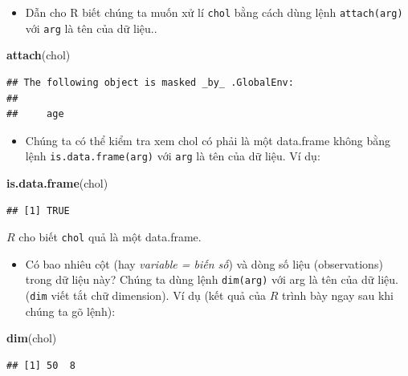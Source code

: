 \documentclass[
]{book}
\newenvironment{Shaded}{\begin{snugshade}}{\end{snugshade}}
\newcommand{\KeywordTok}[1]{\textcolor[rgb]{0.13,0.29,0.53}{\textbf{#1}}}
\newcommand{\NormalTok}[1]{#1}
\providecommand{\tightlist}{%
  \setlength{\itemsep}{0pt}\setlength{\parskip}{0pt}}
\begin{document}
\begin{itemize}
\tightlist
\item
  Dẫn cho R biết chúng ta muốn xử lí \texttt{chol} bằng cách dùng lệnh \texttt{attach(arg)} với \texttt{arg} là tên của dữ liệu..
\end{itemize}

\begin{Shaded}
\begin{Highlighting}[]
\KeywordTok{attach}\NormalTok{(chol)}
\end{Highlighting}
\end{Shaded}

\begin{verbatim}
## The following object is masked _by_ .GlobalEnv:
## 
##     age
\end{verbatim}

\begin{itemize}
\tightlist
\item
  Chúng ta có thể kiểm tra xem chol có phải là một data.frame không bằng lệnh \texttt{is.data.frame(arg)} với \texttt{arg} là tên của dữ liệu. Ví dụ:
\end{itemize}

\begin{Shaded}
\begin{Highlighting}[]
\KeywordTok{is.data.frame}\NormalTok{(chol)}
\end{Highlighting}
\end{Shaded}

\begin{verbatim}
## [1] TRUE
\end{verbatim}

\(R\) cho biết \texttt{chol} quả là một data.frame.

\begin{itemize}
\tightlist
\item
  Có bao nhiêu cột (hay \emph{variable = biến số}) và dòng số liệu (observations) trong dữ liệu này? Chúng ta dùng lệnh \texttt{dim(arg)} với arg là tên của dữ liệu. (\texttt{dim} viết tắt chữ dimension). Ví dụ (kết quả của \(R\) trình bày ngay sau khi chúng ta gõ lệnh):
\end{itemize}

\begin{Shaded}
\begin{Highlighting}[]
\KeywordTok{dim}\NormalTok{(chol)}
\end{Highlighting}
\end{Shaded}

\begin{verbatim}
## [1] 50  8
\end{verbatim}
\end{document}

